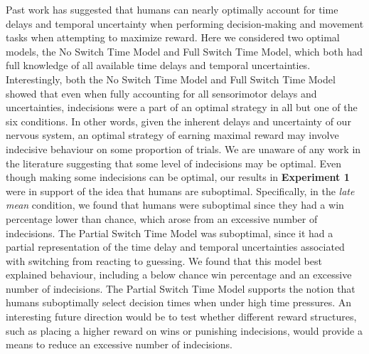\documentclass[12pt]{article}
\newcommand\boldblue[1]{\textcolor{mydarkblue}{\textbf{#1}}}
\begin{document}
Past work has suggested that humans can nearly optimally account for time delays and temporal uncertainty when performing decision-making \autocite*{balciRiskAssessmentMan2009,jazayeriTemporalContextCalibrates2010,balciOptimalTemporalRisk2011} and movement tasks \autocite*{hudsonOptimalCompensationTemporal2008,deanTradingSpeedAccuracy2007} when attempting to maximize reward. Here we considered two optimal models, the No Switch Time Model and Full Switch Time Model, which both had full knowledge of all available time delays and temporal uncertainties. Interestingly, both the No Switch Time Model and Full Switch Time Model showed that even when fully accounting for all sensorimotor delays and uncertainties, indecisions were a part of an optimal strategy in all but one of the six conditions. In other words, given the inherent delays and uncertainty of our nervous system\autocite{faisalNoiseNervousSystem2008}, an optimal strategy of earning maximal reward may involve indecisive behaviour on some proportion of trials. We are unaware of any work in the literature suggesting that some level of indecisions may be optimal. Even though making some indecisions can be optimal, our results in \boldblue{Experiment 1} were in support of the idea that humans are suboptimal. Specifically, in the \emph{late mean} condition, we found that humans were suboptimal since they had a win percentage lower than chance, which arose from an excessive number of indecisions. The Partial Switch Time Model was suboptimal, since it had a partial representation of the time delay and temporal uncertainties associated with switching from reacting to guessing. We found that this model best explained behaviour, including a below chance win percentage and an excessive number of indecisions. The Partial Switch Time Model supports the notion that humans suboptimally select decision times when under high time pressures. An interesting future direction would be to test whether different reward structures, such as placing a higher reward on wins or punishing indecisions\autocite*{kahnemanProspectTheoryAnalysis2013,rothReinforcementbasedProcessesActively2023,rothPunishmentLeadsGreater2024,galeaDissociableEffectsPunishment2015}, would provide a means to reduce an excessive number of indecisions.
\end{document}
